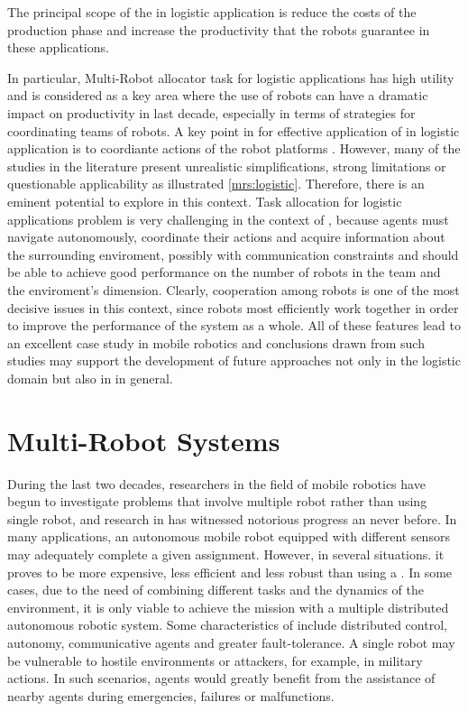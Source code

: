 The principal scope of the \mrs in logistic application is reduce the costs of the production phase 
and increase the productivity that the robots guarantee in these applications.

In particular, Multi-Robot allocator task for logistic applications
has high utility and is considered as a key area where the use of robots can have a 
dramatic impact on productivity in last decade, especially in terms of strategies for coordinating
teams of robots. 
A key point in for effective application of \mrs in logistic application is to coordiante 
actions of the robot platforms \cite{maxsum}.
However, many of the studies in the literature present unrealistic
simplifications, strong limitations or questionable applicability as illustrated \ref{mrs:logistic}.
Therefore, there is an eminent potential to explore in this context.
\newline
Task allocation for logistic applications problem is very challenging
in the context of \mrs, because agents must navigate autonomously,
coordinate their actions and acquire information
about the surrounding enviroment, possibly with communication constraints and 
should be able to achieve good performance 
on the number of robots in the team and the enviroment's dimension.
Clearly, cooperation among robots is one of the most decisive issues in this context,
since robots most efficiently work together in order to improve the performance of the system as a whole.
All of these features lead to an excellent case study in mobile robotics
and conclusions drawn from such studies may support the development of future
approaches not only in the logistic domain but also in \mrs in
general.

\section{Multi-Robot Systems}
During the last two decades, researchers in the field of mobile robotics have begun 
to investigate problems that involve multiple robot rather than using single robot, and 
research in \mrs has witnessed notorious progress an never before.
In many applications, an autonomous mobile robot equipped with different sensors
may adequately complete a given assignment. However, in several situations. it proves
to be more expensive, less efficient and less robust than using a \mrs. 
In some cases, due to the need of combining different tasks and the dynamics of the environment,
it is only viable to achieve the mission with a multiple distributed autonomous robotic system.  
Some characteristics of \mrs include distributed control, autonomy,
communicative agents and greater fault-tolerance.
A single robot may be vulnerable to hostile environments or attackers, for example, in military actions.
In such scenarios, agents would greatly benefit from the assistance of nearby agents during emergencies,
failures or malfunctions.

